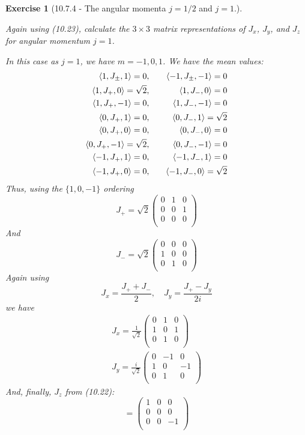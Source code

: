 \documentclass[12pt]{article}
\def\be{\begin{equation}}
\def\ee{\end{equation}}
\def\bee{\begin{equation*}}
\def\eee{\end{equation*}}
\def\bea{\begin{eqnarray*}}
\def\eea{\end{eqnarray*}}
\def\f{\frac}
\newtheorem{exercise}{Exercise}
\begin{document}
\begin{exercise}[10.7.4 - The angular momenta $j=1/2$ and $j = 1$.]
\begin{exercises}
			\item Again using (10.23), calculate the $3\times3$ matrix representations of $J_x$, $J_y$, and $J_z$ for angular momentum $j = 1$.
			\begin{multianswer}
				In this case as $j=1$, we have $m=-1, 0 , 1$. We have the mean values:
				\bea
					\braket{1, J_\pm, 1} = 0, &\quad& \braket{-1, J_\pm, -1} = 0 \\
					\braket{1, J_+, 0} = \sqrt{2}, &\quad& \braket{1, J_-, 0} = 0 \\
					\braket{1, J_+, -1} = 0, &\quad& \braket{1, J_-, -1} = 0 \\
					\braket{0, J_+, 1} = 0, &\quad& \braket{0, J_-, 1} = \sqrt{2} \\
					\braket{0, J_+, 0} = 0, &\quad& \braket{0, J_-, 0} = 0 \\
					\braket{0, J_+, -1} = \sqrt{2}, &\quad& \braket{0, J_-, -1} = 0 \\
					\braket{-1, J_+, 1} = 0, &\quad& \braket{-1, J_-, 1} = 0 \\
					\braket{-1, J_+, 0} = 0, &\quad& \braket{-1, J_-, 0} = \sqrt{2} 
				\eea
				Thus, using the $\{ 1, 0, -1\}$ ordering
				\be
					J_+ = \sqrt{2}
					\begin{pmatrix}
						0 & 1 & 0 \\
						0 & 0 & 1 \\
						0 & 0 & 0 \\
					\end{pmatrix}
				\ee
				And
				\be
				J_- = \sqrt{2}
				\begin{pmatrix}
					0 & 0 & 0 \\
					1 & 0 & 0 \\
					0 & 1 & 0 \\
				\end{pmatrix}
				\ee
				Again using
				\be
					J_x = \f{J_+ + J_-}{2}, \quad J_y = \f{J_+ - J_y}{2i}
				\ee
				we have
				\bea
					J_x = \f{1}{\sqrt{2}}
					\begin{pmatrix}
						0 & 1 & 0 \\
						1 & 0 & 1 \\
						0 & 1 & 0 \\
					\end{pmatrix} \\
					J_y = \f{i}{\sqrt{2}}
					\begin{pmatrix}
						0 & -1 & 0 \\
						1 & 0 & -1 \\
						0 & 1 & 0 \\
					\end{pmatrix}
				\eea
				And, finally, $J_z$ from (10.22):
				\bee
					= 
					\begin{pmatrix}
						1 & 0 & 0 \\
						0 & 0 & 0 \\
						0 & 0 & -1 \\
					\end{pmatrix}
				\eee
			\end{multianswer}
			

\end{exercises}
\end{exercise}
\end{document}
